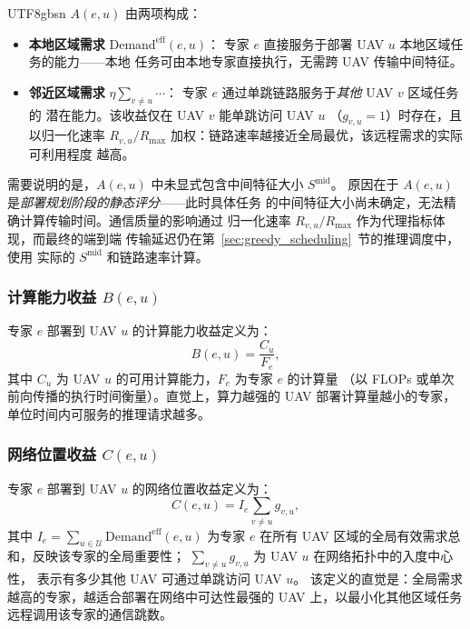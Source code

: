 \documentclass[conference]{IEEEtran}
\begin{document}
\begin{CJK*}{UTF8}{gbsn}
$A(e,u)$ 由两项构成：
\begin{itemize}
  \item \textbf{本地区域需求} $\mathrm{Demand}^{\mathrm{eff}}(e,u)$：
        专家 $e$ 直接服务于部署 UAV $u$ 本地区域任务的能力——本地
        任务可由本地专家直接执行，无需跨 UAV 传输中间特征。
  \item \textbf{邻近区域需求} $\eta\sum_{v\neq u}\cdots$：
        专家 $e$ 通过单跳链路服务于\emph{其他} UAV $v$ 区域任务的
        潜在能力。该收益仅在 UAV $v$ 能单跳访问 UAV $u$
        （$g_{v,u}=1$）时存在，且以归一化速率 $R_{v,u}/R_{\max}$
        加权：链路速率越接近全局最优，该远程需求的实际可利用程度
        越高。
\end{itemize}

需要说明的是，$A(e,u)$ 中未显式包含中间特征大小 $S^{\mathrm{mid}}$。
原因在于 $A(e,u)$ 是\emph{部署规划阶段的静态评分}——此时具体任务
的中间特征大小尚未确定，无法精确计算传输时间。通信质量的影响通过
归一化速率 $R_{v,u}/R_{\max}$ 作为代理指标体现，而最终的端到端
传输延迟仍在第~\ref{sec:greedy_scheduling}~节的推理调度中，使用
实际的 $S^{\mathrm{mid}}$ 和链路速率计算。

\subsubsection{计算能力收益 \texorpdfstring{$B(e,u)$}{B(e,u)}}

专家 $e$ 部署到 UAV $u$ 的计算能力收益定义为：
\begin{equation}
B(e,u) = \frac{C_u}{F_e},
\label{eq:B}
\end{equation}
其中 $C_u$ 为 UAV $u$ 的可用计算能力，$F_e$ 为专家 $e$ 的计算量
（以 FLOPs 或单次前向传播的执行时间衡量）。直觉上，算力越强的 UAV
部署计算量越小的专家，单位时间内可服务的推理请求越多。

\subsubsection{网络位置收益 \texorpdfstring{$C(e,u)$}{C(e,u)}}

专家 $e$ 部署到 UAV $u$ 的网络位置收益定义为：
\begin{equation}
C(e,u) = I_e \sum_{v\neq u} g_{v,u},
\label{eq:C}
\end{equation}
其中
$I_e = \sum_{u\in\mathcal{U}} \mathrm{Demand}^{\mathrm{eff}}(e,u)$
为专家 $e$ 在所有 UAV 区域的全局有效需求总和，反映该专家的全局重要性；
$\sum_{v\neq u} g_{v,u}$ 为 UAV $u$ 在网络拓扑中的入度中心性，
表示有多少其他 UAV 可通过单跳访问 UAV $u$。
该定义的直觉是：全局需求越高的专家，越适合部署在网络中可达性最强的
UAV 上，以最小化其他区域任务远程调用该专家的通信跳数。


\end{CJK*}
\end{document}
